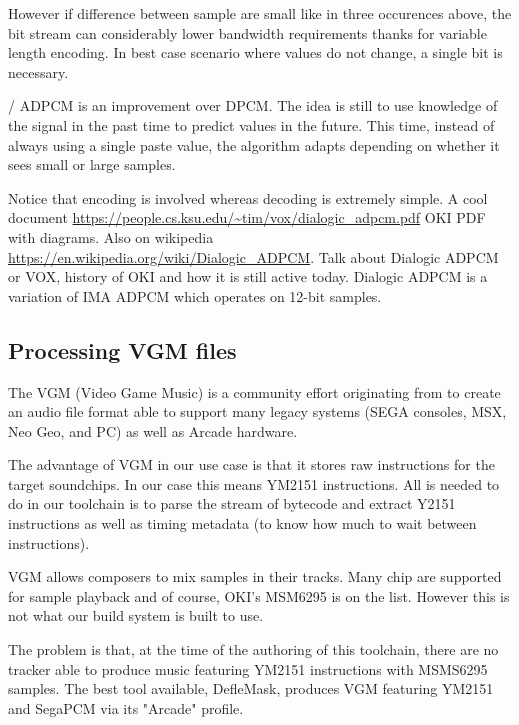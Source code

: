 

However if difference between sample are small like in three occurences above, the bit stream can considerably lower bandwidth requirements thanks for variable length encoding. In best case scenario where values do not change, a single bit is necessary.

/
ADPCM is an improvement over DPCM. The idea is still to use knowledge of the signal in the past time to predict values in the future. This time, instead of always using a single paste value, the algorithm adapts depending on whether it sees small or large samples.



Notice that encoding is involved whereas decoding is extremely simple. A cool document \url{https://people.cs.ksu.edu/~tim/vox/dialogic_adpcm.pdf} OKI PDF with diagrams. Also on wikipedia \url{https://en.wikipedia.org/wiki/Dialogic_ADPCM}. Talk about Dialogic ADPCM or VOX, history of OKI and how it is still active today. Dialogic ADPCM is a variation of IMA ADPCM which operates on 12-bit samples.


\subsection{Processing VGM files}
The VGM (Video Game Music) is a community effort originating from  to create an audio file format able to support many legacy systems (SEGA consoles, MSX, Neo Geo, and PC) as well as Arcade hardware.

The advantage of VGM in our use case is that it stores raw instructions for the target soundchips. In our case this means YM2151 instructions. All is needed to do in our toolchain is to parse the stream of bytecode and extract Y2151 instructions as well as timing metadata (to know how much to wait between instructions).

VGM allows composers to mix samples in their tracks. Many chip are supported for sample playback and of course, OKI's MSM6295 is on the list. However this is not what our build system is built to use.

The problem is that, at the time of the authoring of this toolchain, there are no tracker able to produce music featuring YM2151 instructions with MSMS6295 samples. The best tool available, DefleMask, produces VGM featuring YM2151 and SegaPCM via its "Arcade" profile.

